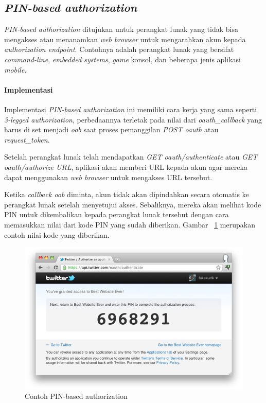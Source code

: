 \subsection{\textit{PIN-based authorization}}
\textit{PIN-based authorization} ditujukan untuk perangkat lunak yang tidak bisa mengakses atau menanamkan \textit{web browser} untuk mengarahkan akun kepada \textit{authorization endpoint}. Contohnya adalah perangkat lunak yang bersifat \textit{command-line}, \textit{embedded systems}, \textit{game} konsol, dan beberapa jenis aplikasi \textit{mobile}.


\paragraph{Implementasi}

Implementasi \textit{PIN-based authorization} ini memiliki cara kerja yang sama seperti \textit{3-legged authorization}, perbedaannya terletak pada nilai dari \textit{oauth\_callback} yang harus di set menjadi \textit{oob} saat proses pemanggilan \textit{POST oauth} atau \textit{request\_token}.

Setelah perangkat lunak telah mendapatkan \textit{GET oauth/authenticate} atau \textit{GET oauth/authorize URL}, aplikasi akan memberi URL kepada akun agar mereka dapat menggunakan \textit{web browser} untuk mengakses URL tersebut.

Ketika \textit{callback oob} diminta, akun tidak akan dipindahkan secara otomatis ke perangkat lunak setelah menyetujui akses. Sebaliknya, mereka akan melihat kode PIN untuk dikembalikan kepada perangkat lunak tersebut dengan cara memasukkan nilai dari kode PIN yang sudah diberikan. Gambar ~\ref{fig:pin} merupakan contoh nilai kode yang diberikan.

\begin{figure}[H]
\centering
\includegraphics{Gambar/pin.png}
\caption{Contoh PIN-based authorization}
	\label{fig:pin}
\end{figure}

